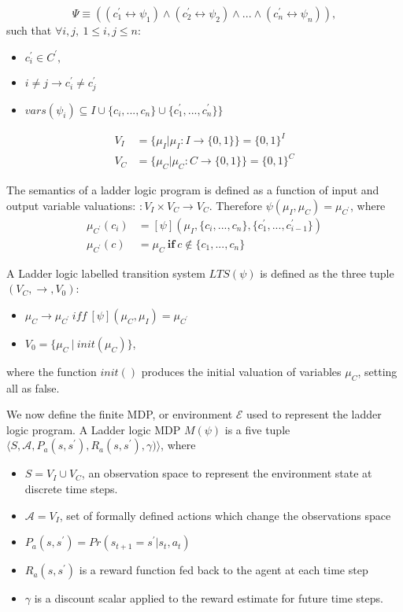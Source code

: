 \documentclass[runningheads]{llncs}
\begin{document}
\begin{equation}
	\Psi \equiv ((c^\prime_1 \leftrightarrow \psi_1) \land(c^\prime_2 \leftrightarrow \psi_2) \land ... \land (c_n^\prime \leftrightarrow \psi_n)), 
\end{equation}   
such that $\forall i,j,  \ 1 \leq i,j \leq n:$
 \begin{itemize}
	\item $c^{\prime}_i \in C^\prime,$
	\item $ i \neq j \to c^\prime_i \neq c^\prime_j$
	\item $vars(\psi_i) \subseteq I \cup \{c_i, ...,c_n\} \cup \{c^\prime_1, ..., c^\prime_n\} \}$
\end{itemize} 
\begin{align}
	V_I & = \{\mu_I | \mu_I : I \to \{0,1\}\} = \{0,1\}^I \\
	V_C & = \{\mu_C | \mu_C : C \to \{0,1\}\} = \{0,1\}^C 
\end{align}

The semantics of a ladder logic program is defined as a function of input and output variable valuations:
\begin{math}
	[\psi] : V_I \times V_C \to V_C
\end{math}. Therefore $\psi(\mu_I, \mu_C) = \mu_{C^\prime}$, where
\begin{align}
	\mu_{C^\prime}(c_i) & = [\psi](\mu_I, \{c_i,...,c_n\}, \{c^\prime_1,...,c^\prime_{i-1}\}) \\
	\mu_{C^\prime}(c) & = \mu_C \ \mathbf{if} \ c \notin \{c_1,...,c_n\} 
\end{align} 

A Ladder logic labelled transition system $LTS(\psi)$ is defined as the three tuple $(V_C, \to, V_0)$:
\begin{itemize}
	\item $\mu_C \to \mu_{C^\prime} \ \textit{iff} \ [\psi](\mu_C,\mu_I)=\mu_{C^\prime}$
	\item $V_0 = \{\mu_C \ | \ init(\mu_C)\}$,
\end{itemize}where the function $init()$ produces the initial valuation of variables $\mu_C$, setting all as false.


We now define the finite MDP, or environment $\mathcal{E}$ used to represent the ladder logic program. A Ladder logic MDP $M(\psi)$ is a five tuple $\langle S,\mathcal{A},P_a(s,s^\prime), R_a(s,s^\prime),\gamma) \rangle$, where 
\begin{itemize}
	\item $S = V_I \cup V_C$, an observation space to represent the environment state at discrete time steps.
	\item $\mathcal{A} = V_I$, set of formally defined actions which change the observations space
	\item $P_a(s,s^\prime) = Pr(s_{t+1} = s^\prime | s_t, a_t)$
	\item $R_a(s,s^\prime)$ is a reward function fed back to the agent at each time step
	\item $\gamma$ is a discount scalar applied to the reward estimate for future time steps.
\end{itemize}
\end{document}
